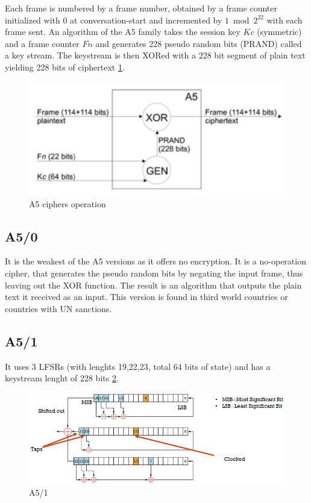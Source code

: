 Each frame is numbered by a frame number, obtained by a frame counter initialized with 0 at conversation-start and incremented by $1 \bmod 2^{22}$ with each frame sent. An algorithm of the A5 family takes the session key $Kc$ (symmetric) and a frame counter $Fn$ and generates 228 pseudo random bits (PRAND) called a key stream. The keystream is then XORed with a 228 bit segment of plain text yielding 228 bits of ciphertext \ref{fig:A5ops}.

\begin{figure}
	\centering
	\includegraphics[width=0.7\linewidth]{Images/Chapter2/A5ops}
	\caption{A5 ciphers operation}
	\label{fig:A5ops}
\end{figure}


\subsection{A5/0}

It is the weakest of the A5 versions as it offers no encryption. It is a no-operation cipher, that generates the pseudo random bits by negating the input frame, thus leaving out the XOR function. The result is an algorithm that outputs the plain text it received as an input. This version is found in third world countries or countries with UN sanctions.

\subsection{A5/1}

It uses 3 LFSRs (with lenghts 19,22,23, total 64 bits of state) and has a keystream lenght of 228 bits \ref{fig:A51}.

\begin{figure}
	\centering
	\includegraphics[width=0.7\linewidth]{Images/Chapter2/A51}
	\caption{A5/1}
	\label{fig:A51}
\end{figure}

